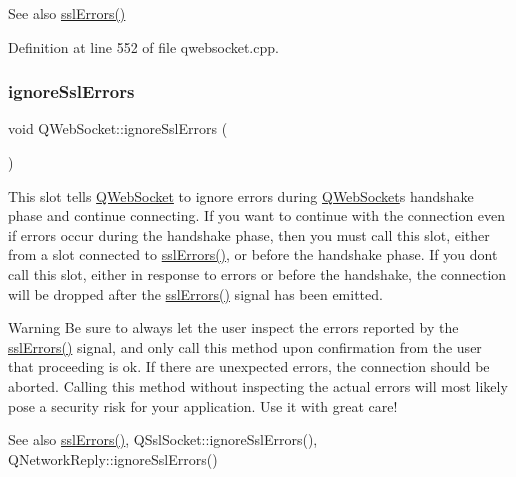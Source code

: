 \begin{DoxySeeAlso}{See also}
\mbox{\hyperlink{class_q_web_socket_ae0d3eebd5b595e4e869d2ad6cef45ed7}{ssl\+Errors()}} 
\end{DoxySeeAlso}


Definition at line 552 of file qwebsocket.\+cpp.

\mbox{\label{class_q_web_socket_aed580d710b6613a6218a78f4c07fb856}} 
\subsubsection{\texorpdfstring{ignore\+Ssl\+Errors}{ignoreSslErrors}\hspace{0.1cm}{\footnotesize\ttfamily [2/2]}}
{\footnotesize\ttfamily void Q\+Web\+Socket\+::ignore\+Ssl\+Errors (\begin{DoxyParamCaption}{ }\end{DoxyParamCaption})\hspace{0.3cm}{\ttfamily [slot]}}

This slot tells \mbox{\hyperlink{class_q_web_socket}{Q\+Web\+Socket}} to ignore errors during \mbox{\hyperlink{class_q_web_socket}{Q\+Web\+Socket}}\textquotesingle{}s handshake phase and continue connecting. If you want to continue with the connection even if errors occur during the handshake phase, then you must call this slot, either from a slot connected to \mbox{\hyperlink{class_q_web_socket_ae0d3eebd5b595e4e869d2ad6cef45ed7}{ssl\+Errors()}}, or before the handshake phase. If you don\textquotesingle{}t call this slot, either in response to errors or before the handshake, the connection will be dropped after the \mbox{\hyperlink{class_q_web_socket_ae0d3eebd5b595e4e869d2ad6cef45ed7}{ssl\+Errors()}} signal has been emitted.

\begin{DoxyWarning}{Warning}
Be sure to always let the user inspect the errors reported by the \mbox{\hyperlink{class_q_web_socket_ae0d3eebd5b595e4e869d2ad6cef45ed7}{ssl\+Errors()}} signal, and only call this method upon confirmation from the user that proceeding is ok. If there are unexpected errors, the connection should be aborted. Calling this method without inspecting the actual errors will most likely pose a security risk for your application. Use it with great care!
\end{DoxyWarning}
\begin{DoxySeeAlso}{See also}
\mbox{\hyperlink{class_q_web_socket_ae0d3eebd5b595e4e869d2ad6cef45ed7}{ssl\+Errors()}}, Q\+Ssl\+Socket\+::ignore\+Ssl\+Errors(), Q\+Network\+Reply\+::ignore\+Ssl\+Errors() 
\end{DoxySeeAlso}


